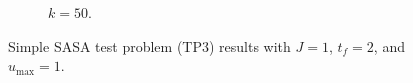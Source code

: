 \begin{figure}[t]
\begin{subfigure}[b]{0.333\textwidth}
        \caption{$k=50$.\label{fig:ch3:sasa_3}}
\end{subfigure}%
\caption[Simple SASA test problem (TP3) results]{Simple SASA test problem (TP3) results with $J=1$, $t_f=2$, and $u_{\max}=1$.\label{fig:ch3:sasa}}
\end{figure}
